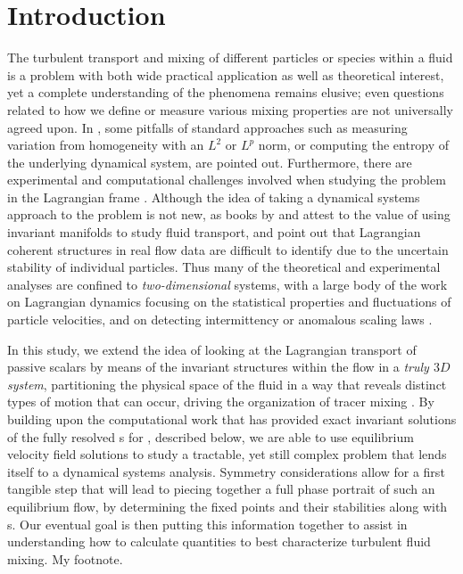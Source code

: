 

\section{Introduction}
\label{s:intro}

The turbulent transport and mixing of different particles or species 
within a fluid is a problem with both wide practical application as well 
as theoretical interest, yet a complete understanding of the phenomena 
remains elusive; even questions related to how we define or measure 
various mixing properties are not universally agreed upon. In 
\citet{MaMPe05}, some pitfalls of standard approaches such as measuring 
variation from homogeneity with an $L^2$ or $L^p$ norm, or computing the 
entropy of the underlying dynamical system, are pointed out. Furthermore, 
there are experimental and computational challenges involved when 
studying the problem in the Lagrangian frame 
\citep{MHPRS07,ABBBBB08,BrLiEc06,MoLePi04}. Although the idea of taking a 
dynamical systems approach to the problem is not new, as books by 
\citet{Botti89} and %
\citet{Wiggins1992} attest to the value of
using invariant manifolds to study fluid transport, \citet{MHPRS07} and 
\citet{Haller02} point out that Lagrangian coherent structures in 
real flow data are difficult to identify due to the uncertain stability 
of individual particles. Thus many of the theoretical and experimental 
analyses are confined to \emph{two-dimensional} systems, with a large 
body of the work on Lagrangian dynamics focusing on the statistical 
properties and fluctuations of particle velocities, and on detecting 
intermittency or anomalous scaling laws 
\citep{EgeChi22,MoLePi04,ABBBBB08,FaGaVe01}. 

In this study, we extend the idea of looking at the Lagrangian transport 
of passive scalars by means of the invariant structures within the flow 
in a \emph{truly $3D$ system}, partitioning the physical space of the 
fluid in a way that reveals distinct types of motion that can occur, 
driving the organization of tracer mixing \citep{Haller02}. By building 
upon the computational work that has provided exact invariant solutions 
of the fully resolved {\NSe}s for {\pCf}, 
described below, we are able to use equilibrium velocity field solutions 
to study a tractable, yet still complex problem that lends itself to a 
dynamical systems analysis. Symmetry considerations allow for a first 
tangible step that will lead to piecing together a full phase portrait of 
such an equilibrium flow, by determining the fixed points and their 
stabilities along with {\hc}s.  Our eventual goal is 
then putting this information together to assist in understanding how to 
calculate quantities to best characterize turbulent fluid mixing. 
 {My footnote.}

